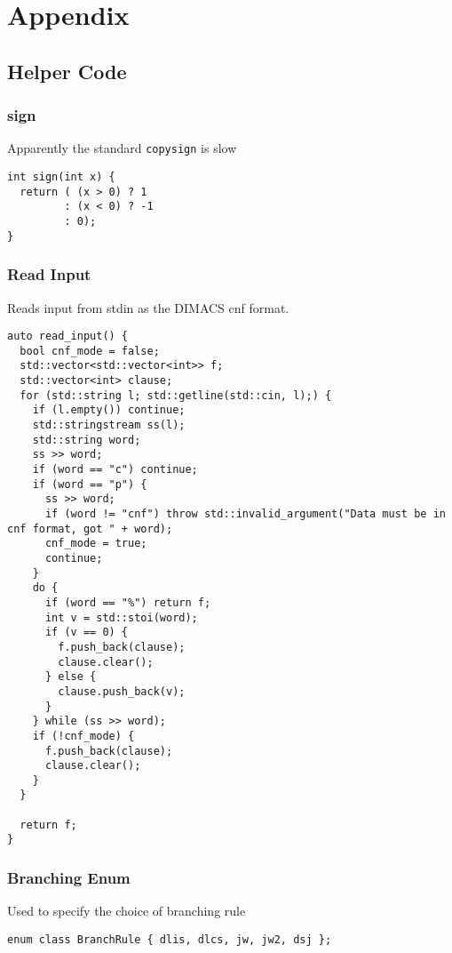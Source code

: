 \documentclass[10pt,AMS Euler]{article}
\begin{document}
\section*{Appendix}
\label{sec:orgd3141b6}
\subsection*{Helper Code}
\label{sec:org083f6b2}
\subsubsection*{sign}
\label{sec:orgebdf69c}
Apparently the standard \texttt{copysign} is slow
\begin{verbatim}
int sign(int x) {
  return ( (x > 0) ? 1
         : (x < 0) ? -1
         : 0);
}
\end{verbatim}
\subsubsection*{Read Input}
\label{sec:orgb050a6a}
Reads input from stdin as the DIMACS cnf format.
\begin{verbatim}
auto read_input() {
  bool cnf_mode = false;
  std::vector<std::vector<int>> f;
  std::vector<int> clause;
  for (std::string l; std::getline(std::cin, l);) {
    if (l.empty()) continue;
    std::stringstream ss(l);
    std::string word;
    ss >> word;
    if (word == "c") continue;
    if (word == "p") {
      ss >> word;
      if (word != "cnf") throw std::invalid_argument("Data must be in cnf format, got " + word);
      cnf_mode = true;
      continue;
    }
    do {
      if (word == "%") return f;
      int v = std::stoi(word);
      if (v == 0) {
        f.push_back(clause);
        clause.clear();
      } else {
        clause.push_back(v);
      }
    } while (ss >> word);
    if (!cnf_mode) { 
      f.push_back(clause);
      clause.clear();
    }
  }
  
  return f;
}
\end{verbatim}
\subsubsection*{Branching Enum}
\label{sec:org8c77d14}
Used to specify the choice of branching rule
\begin{verbatim}
enum class BranchRule { dlis, dlcs, jw, jw2, dsj };
\end{verbatim}
\end{document}
